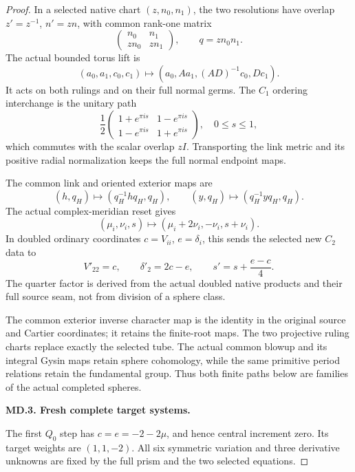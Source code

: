 \begin{proof}
In a selected native chart \((z,n_0,n_1)\), the two resolutions have overlap
\(z'=z^{-1}\), \(n'=zn\), with common rank-one matrix
\[
 \begin{pmatrix}n_0&n_1\\zn_0&zn_1\end{pmatrix},
 \qquad q=zn_0n_1.
\]
The actual bounded torus lift is
\[
 (a_0,a_1,c_0,c_1)\mapsto
 (a_0,Aa_1,(AD)^{-1}c_0,Dc_1).
\]
It acts on both rulings and on their full normal germs. The \(C_1\) ordering interchange is the unitary path
\[
 \frac12
 \begin{pmatrix}1+e^{\pi is}&1-e^{\pi is}\\
                 1-e^{\pi is}&1+e^{\pi is}\end{pmatrix},
 \quad 0\le s\le1 ,
\]
which commutes with the scalar overlap \(zI\). Transporting the link metric and its positive radial normalization keeps the full normal endpoint maps.

The common link and oriented exterior maps are
\[
 (h,q_H)\mapsto(q_H^{-1}hq_H,q_H),\qquad
 (y,q_H)\mapsto(q_H^{-1}yq_H,q_H).
\]
The actual complex-meridian reset gives
\[
 (\mu_i,\nu_i,s)\mapsto(\mu_i+2\nu_i,-\nu_i,s+\nu_i).
\]
In doubled ordinary coordinates \(c=V_{ii}\), \(e=\delta_i\), this sends the selected new \(C_2\) data to
\[
 V'_{22}=c,\qquad \delta'_2=2c-e,\qquad
 s'=s+\frac{e-c}{4}.
\]
The quarter factor is derived from the actual doubled native products and their full source seam, not from division of a sphere class.

The common exterior inverse character map is the identity in the original source and Cartier coordinates; it retains the finite-root maps. The two projective ruling charts replace exactly the selected tube. The actual common blowup and its integral Gysin maps retain sphere cohomology, while the same primitive period relations retain the fundamental group. Thus both finite paths below are families of the actual completed spheres.

\par\medskip\noindent\textbf{MD.3. Fresh complete target systems.}\par\nopagebreak[4]

The first \(Q_0\) step has \(c=e=-2-2\mu\), and hence central increment zero. Its target weights are \((1,1,-2)\). All six symmetric variation and three derivative unknowns are fixed by the full prism and the two selected equations.


\end{proof}
